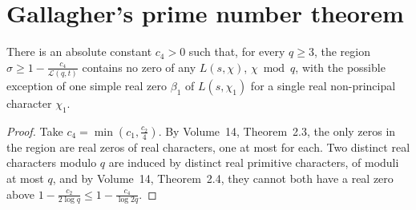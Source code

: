 \section{Gallagher's prime number theorem}

\begin{lemma}\label{lem:onezero}
There is an absolute constant $c_4>0$ such that, for every $q\ge3$, the region $\sigma\ge1-\frac{c_4}{\mathcal L(q,t)}$ contains no zero of any $L(s,\chi)$, $\chi\bmod q$, with the possible exception of one simple real zero $\beta_1$ of $L(s,\chi_1)$ for a single real non-principal character $\chi_1$.
\end{lemma}
\begin{proof}
Take $c_4=\min(c_1,\frac{c_2}4)$. By Volume~14, Theorem~2.3, the only zeros in the region are real zeros of real characters, one at most for each. Two distinct real characters modulo $q$ are induced by distinct real primitive characters, of moduli at most $q$, and by Volume~14, Theorem~2.4, they cannot both have a real zero above $1-\frac{c_2}{2\log q}\le1-\frac{c_4}{\log 2q}$.
\end{proof}

